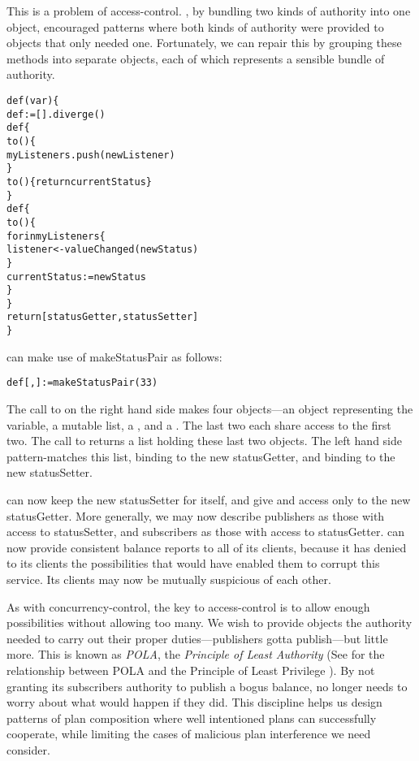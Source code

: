 \documentclass{llncs}
\begin{document}
This is a problem of access-control. , by bundling two kinds
of authority into one object, encouraged patterns where both kinds of
authority were provided to objects that only needed one. Fortunately,
we can repair this by grouping these methods into separate objects,
each of which represents a sensible bundle of authority.
%
\begin{alltt}
    def (var ) \{
        def  := [].diverge()
        def  \{
            to () \{
                myListeners.push(newListener)
            \}
            to () \{ return currentStatus \}
        \}
        def  \{
            to () \{
                for  in myListeners \{
                    listener <- valueChanged(newStatus)
                \}
                currentStatus := newStatus
            \}
        \}
        return [statusGetter, statusSetter]
    \}
\end{alltt}
%
 can make use of makeStatusPair as follows:
%
\begin{alltt}
    def [, ] := makeStatusPair(33)
\end{alltt}
%
The call to  on the right hand side makes four
objects---an object representing the  variable, a
mutable  list, a , and a
. The last two each share access to the first
two. The call to  returns a list holding these
last two objects. The left hand side pattern-matches this list,
binding  to the new statusGetter, and binding
 to the new statusSetter.

 can now keep the new statusSetter for itself, and give
 and  access only to the new statusGetter. More
generally, we may now describe publishers as those with access to
statusSetter, and subscribers as those with access to
statusGetter.  can now provide consistent balance reports to
all of its clients, because it has denied to its clients the
possibilities that would have enabled them to corrupt this
service. Its clients may now be mutually suspicious of each other.

As with concurrency-control, the key to access-control is to allow
enough possibilities without allowing too many. We wish to provide
objects the authority needed to carry out their proper
duties---publishers gotta publish---but little more. This is known as
\emph{POLA}, the \emph{Principle of Least Authority} (See
\cite{miller:paradigm} for the relationship between POLA and the
Principle of Least Privilege \cite{SaltzerSc75}). By not granting its
subscribers authority to publish a bogus balance,  no longer
needs to worry about what would happen if they did. This discipline
helps us design patterns of plan composition where well intentioned
plans can successfully cooperate, while limiting the cases of
malicious plan interference we need consider.
\end{document}

